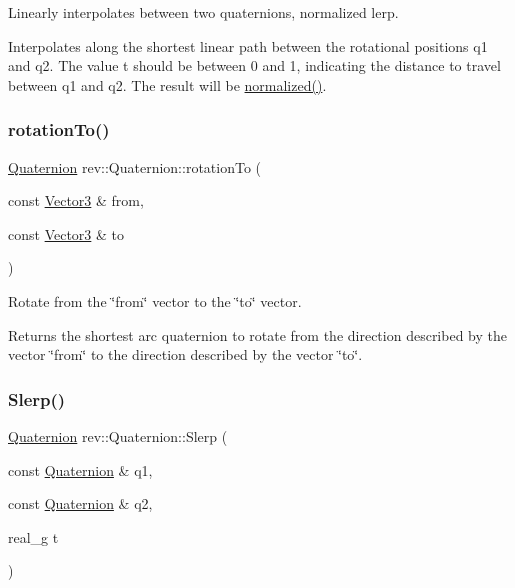 Linearly interpolates between two quaternions, normalized lerp. 

Interpolates along the shortest linear path between the rotational positions q1 and q2. The value t should be between 0 and 1, indicating the distance to travel between q1 and q2. The result will be \mbox{\hyperlink{classrev_1_1_quaternion_aa026d0ceaf60d4145310cf30b91cb53b}{normalized()}}. \mbox{\label{classrev_1_1_quaternion_ab62c7a0d6e6254c18bf5f61801e1755b}} 
\subsubsection{\texorpdfstring{rotationTo()}{rotationTo()}}
{\footnotesize\ttfamily \mbox{\hyperlink{classrev_1_1_quaternion}{Quaternion}} rev\+::\+Quaternion\+::rotation\+To (\begin{DoxyParamCaption}\item[{const \mbox{\hyperlink{classrev_1_1_vector}{Vector3}} \&}]{from,  }\item[{const \mbox{\hyperlink{classrev_1_1_vector}{Vector3}} \&}]{to }\end{DoxyParamCaption})\hspace{0.3cm}{\ttfamily [static]}}



Rotate from the \char`\"{}from\char`\"{} vector to the \char`\"{}to\char`\"{} vector. 

Returns the shortest arc quaternion to rotate from the direction described by the vector \char`\"{}from\char`\"{} to the direction described by the vector \char`\"{}to\char`\"{}. \mbox{\label{classrev_1_1_quaternion_acd605fb272c8b954eb5ec0982532a81c}} 
\subsubsection{\texorpdfstring{Slerp()}{Slerp()}}
{\footnotesize\ttfamily \mbox{\hyperlink{classrev_1_1_quaternion}{Quaternion}} rev\+::\+Quaternion\+::\+Slerp (\begin{DoxyParamCaption}\item[{const \mbox{\hyperlink{classrev_1_1_quaternion}{Quaternion}} \&}]{q1,  }\item[{const \mbox{\hyperlink{classrev_1_1_quaternion}{Quaternion}} \&}]{q2,  }\item[{real\+\_\+g}]{t }\end{DoxyParamCaption})\hspace{0.3cm}{\ttfamily [static]}}



